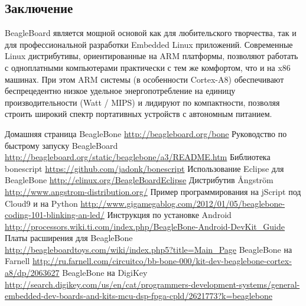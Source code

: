 \documentclass[10pt, a5paper]{article}
\begin{document}
\subsection*{Заключение}

BeagleBoard является мощной основой как для любительского творчества, так и для профессиональной разработки Embedded Linux приложений. Современные Linux дистрибутивы, ориентированные на ARM платформы, позволяют работать с одноплатными компьютерами практически с тем же комфортом, что и на x86 машинах. При этом ARM системы (в особенности Cortex-A8) обеспечивают беспрецедентно низкое удельное энергопотребление на единицу производительности (Watt / MIPS) и лидируют по компактности, позволяя строить широкий спектр портативных устройств с автономным питанием.

\begin{thebibliography}
   Домашняя страница BeagleBone \url{http://beagleboard.org/bone}
   Руководство по быстрому запуску BeagleBoard \url{http://beagleboard.org/static/beaglebone/a3/README.htm}
   Библиотека bonescript \url{https://github.com/jadonk/bonescript}
   Использование Eclipse для BeagleBone \url{http://elinux.org/BeagleBoardEclipse}
   Дистрибутив \AA{}ngstr\"{o}m \url{http://www.angstrom-distribution.org/}
   Пример программирования на jScript под Cloud9 и на Python \url{http://www.gigamegablog.com/2012/01/05/beaglebone-coding-101-blinking-an-led/}
   Инструкция по установке Android \url{http://processors.wiki.ti.com/index.php/BeagleBone-Android-DevKit_Guide}
   Платы расширения для BeagleBone \url{http://beagleboardtoys.com/wiki/index.php5?title=Main_Page}
   BeagleBone на Farnell \url{http://ru.farnell.com/circuitco/bb-bone-000/kit-dev-beaglebone-cortex-a8/dp/2063627}
   BeagleBone на DigiKey \url{http://search.digikey.com/us/en/cat/programmers-development-systems/general-embedded-dev-boards-and-kits-mcu-dsp-fpga-cpld/2621773?k=beaglebone}
\end{thebibliography}
\end{document}
